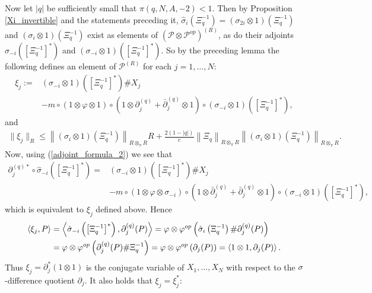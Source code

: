 Now let $|q|$ be sufficiently small that $\pi(q,N,A,-2)<1$. Then by Proposition \ref{Xi_invertible} and the statements preceding it, $\hat{\sigma}_{i}(\Xi_q^{-1}) = (\sigma_{2i}\otimes 1)(\Xi_q^{-1})$ and $(\sigma_{i}\otimes 1)(\Xi_q^{-1})$ exist as elements of $(\mathscr{P}\otimes\mathscr{P}^{op})^{(R)}$, as do their adjoints $\hat{\sigma}_{-i}\left(\left[\Xi_q^{-1}\right]^*\right)$ and $(\sigma_{-i}\otimes 1)\left(\left[\Xi_q^{-1}\right]^*\right)$. So by the preceding lemma the following defines an element of $\mathscr{P}^{(R)}$ for each $j=1,\ldots, N$: 
	\begin{align}\label{def_xi}
		\xi_j:=& (\sigma_{-i}\otimes 1)\left(\left[\Xi_q^{-1}\right]^*\right)\# X_j \\
					&- m\circ(1\otimes\varphi\otimes 1)\circ \left(1\otimes\partial_j^{(q)} + \bar{\partial}_j^{(q)}\otimes 1\right)\circ(\sigma_{-i}\otimes 1)\left(\left[\Xi_q^{-1}\right]^*\right),
	\end{align}
and
	\begin{align}\label{xi_R_norm}
		\|\xi_j\|_R \leq \left\| (\sigma_{i}\otimes 1)\left(\Xi_q^{-1}\right)\right\|_{R\otimes_\pi R} R + \frac{2(1-|q|)}{c}\left\| \Xi_q\right\|_{R\otimes_\pi R} \left\| (\sigma_{i}\otimes 1)\left(\Xi_q^{-1}\right)\right\|_{R\otimes_\pi R}.
	\end{align}
Now, using (\ref{adjoint_formula_2}) we see that
	\begin{align*}
		\partial_j^{(q)*}\circ\hat{\sigma}_{-i}\left(\left[\Xi_q^{-1}\right]^*\right) =& (\sigma_{-i}\otimes 1)\left(\left[\Xi_q^{-1}\right]^*\right)\# X_j \\
														&- m\circ(1\otimes\varphi\otimes \sigma_{-i})\circ\left(1\otimes \bar{\partial}_j^{(q)} + \bar{\partial}_j^{(q)}\otimes 1\right)\circ(\sigma_{-i}\otimes 1)\left(\left[\Xi_q^{-1}\right]^*\right),
	\end{align*} 
which is equivalent to $\xi_j$ defined above. Hence
	\begin{align*}
		\left\langle\xi_j,P\right\rangle&=\left\langle\hat{\sigma}_{-i}\left(\left[\Xi_q^{-1}\right]^*\right), \partial_j^{(q)}(P)\right\rangle = \varphi\otimes\varphi^{op}\left( \hat{\sigma}_i\left(\Xi_q^{-1}\right)\#\partial_{j}^{(q)}(P)\right) \\
			&= \varphi\otimes \varphi^{op}\left(\partial_j^{(q)}(P)\#\Xi_q^{-1}\right)=\varphi\otimes\varphi^{op}\left(\partial_j(P)\right)=\left\langle1\otimes 1, \partial_j(P)\right\rangle.
	\end{align*}
Thus $\xi_j=\partial_j^*(1\otimes 1)$ is the conjugate variable of $X_1,\ldots,X_N$ with respect to the $\sigma$-difference quotient $\partial_j$. It also holds that $\xi_j=\xi_j^*$:
